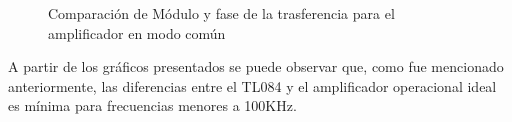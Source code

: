 \begin{figure}[H]
    \centering
{}
\caption{Comparaci\'on de M\'odulo y fase de la trasferencia para el amplificador en modo com\'un}
\label{fig:Comp_common}
\end{figure}

A partir de los gr\'aficos presentados se puede observar que, como fue mencionado anteriormente, las diferencias entre el TL084 y el amplificador operacional ideal es m\'inima para frecuencias menores a 100KHz.

